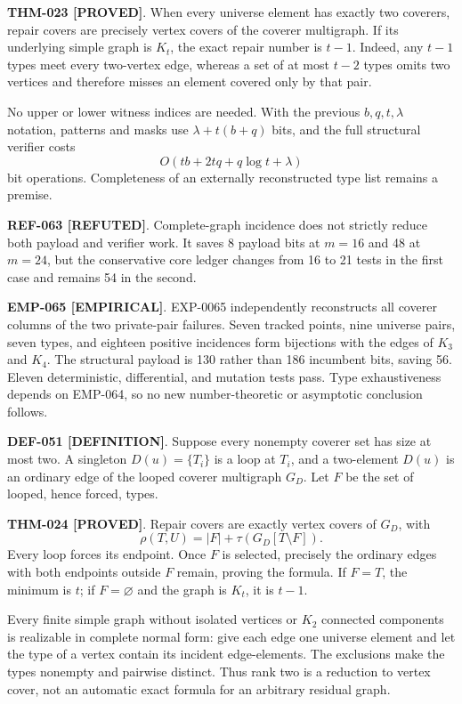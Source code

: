 \documentclass[11pt]{article}
\newcommand{\claimstatus}[2]{\textbf{#1 [#2]}}
\begin{document}
\claimstatus{THM-023}{PROVED}. When every universe element has exactly two
coverers, repair covers are precisely vertex covers of the coverer
multigraph. If its underlying simple graph is \(K_t\), the exact repair
number is \(t-1\). Indeed, any \(t-1\) types meet every two-vertex edge,
whereas a set of at most \(t-2\) types omits two vertices and therefore
misses an element covered only by that pair.

No upper or lower witness indices are needed. With the previous
\(b,q,t,\lambda\) notation, patterns and masks use
\(\lambda+t(b+q)\) bits, and the full structural verifier costs
\[
 O(tb+2tq+q\log t+\lambda)
\]
bit operations. Completeness of an externally reconstructed type list
remains a premise.

\claimstatus{REF-063}{REFUTED}. Complete-graph incidence does not strictly
reduce both payload and verifier work. It saves 8 payload bits at \(m=16\)
and 48 at \(m=24\), but the conservative core ledger changes from 16 to 21
tests in the first case and remains 54 in the second.

\claimstatus{EMP-065}{EMPIRICAL}. EXP-0065 independently reconstructs all
coverer columns of the two private-pair failures. Seven tracked points, nine
universe pairs, seven types, and eighteen positive incidences form
bijections with the edges of \(K_3\) and \(K_4\). The structural payload is
130 rather than 186 incumbent bits, saving 56. Eleven deterministic,
differential, and mutation tests pass. Type exhaustiveness depends on
EMP-064, so no new number-theoretic or asymptotic conclusion follows.

\claimstatus{DEF-051}{DEFINITION}. Suppose every nonempty coverer set has
size at most two. A singleton \(D(u)=\{T_i\}\) is a loop at \(T_i\), and a
two-element \(D(u)\) is an ordinary edge of the looped coverer multigraph
\(G_D\). Let \(F\) be the set of looped, hence forced, types.

\claimstatus{THM-024}{PROVED}. Repair covers are exactly vertex covers of
\(G_D\), with
\[
 \rho(T,U)=|F|+\tau\!\left(G_D[T\setminus F]\right).
\]
Every loop forces its endpoint. Once \(F\) is selected, precisely the
ordinary edges with both endpoints outside \(F\) remain, proving the formula.
If \(F=T\), the minimum is \(t\); if \(F=\varnothing\) and the graph is
\(K_t\), it is \(t-1\).

Every finite simple graph without isolated vertices or \(K_2\) connected
components is realizable in complete normal form: give each edge one universe
element and let the type of a vertex contain its incident edge-elements.
The exclusions make the types nonempty and pairwise distinct. Thus rank two
is a reduction to vertex cover, not an automatic exact formula for an
arbitrary residual graph.
\end{document}
